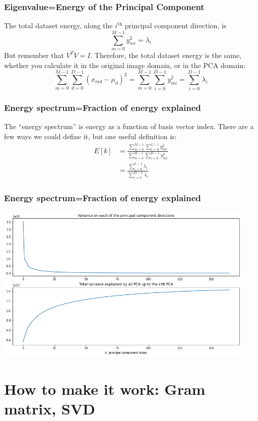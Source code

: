 \documentclass{beamer}
\begin{document}
\begin{frame}
  \frametitle{Eigenvalue=Energy of the Principal Component} The total
  dataset energy, along the $i^{\textrm{th}}$ principal component
  direction, is
  \[
  \sum_{m=0}^{M-1}y_{mi}^2=\lambda_i
  \]
  But remember that $V^TV=I$.  Therefore, the total dataset energy
  is the same, whether you calculate it in the original image
  domain, or in the PCA domain:
  \[
  \sum_{m=0}^{M-1}\sum_{d=0}^{D-1}(x_{md}-\mu_d)^2
  =\sum_{m=0}^{M-1}\sum_{i=0}^{D-1}y_{mi}^2=\sum_{i=0}^{D-1}\lambda_i
  \]
\end{frame}

\begin{frame}
  \frametitle{Energy  spectrum=Fraction of energy explained}
  The ``energy spectrum'' is energy as a function of
  basis vector index.  There are a few ways we could define it,
  but one useful definition is:
  \begin{align*}
    E[k] &=\frac{\sum_{m=0}^{M-1}\sum_{i=0}^{k-1}y_{mi}^2}
    {\sum_{m=0}^{M-1}\sum_{i=0}^{D-1}y_{mi}^2}\\
    &=\frac{\sum_{i=0}^{k-1}\lambda_i}{\sum_{i=0}^{D-1}\lambda_i}
  \end{align*}
\end{frame}

\begin{frame}
  \frametitle{Energy  spectrum=Fraction of energy explained}
  \centerline{\includegraphics[height=3in]{energy_spectrum.png}}
\end{frame}


\section[Gram]{How  to make it work: Gram matrix, SVD}
\setcounter{subsection}{1}
\end{document}
